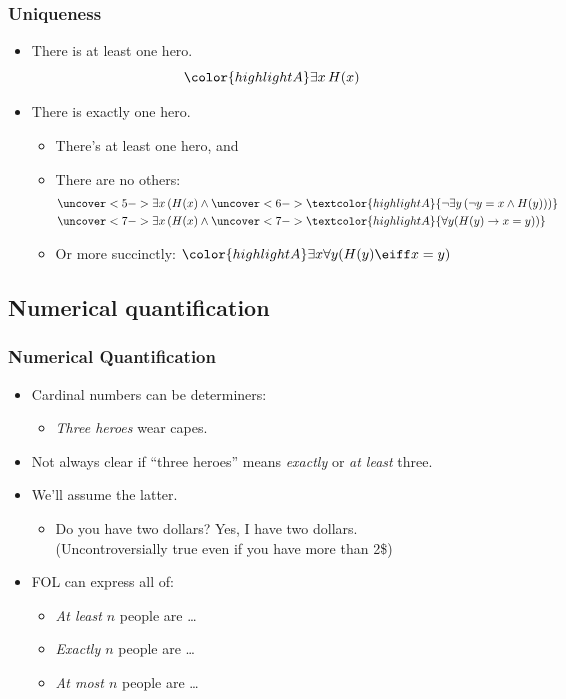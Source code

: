 \begin{frame}
    \frametitle{Uniqueness}

\begin{itemize}[<+->]
\item There is at least one hero.
\[\color{highlightA}
\exists x\, H(x)
\]
\item There is exactly one hero.
\begin{itemize}[<+->]
\item There's at least one hero, and
\item There are no others:
\begin{align*}
\uncover<5->{\exists x\, (H(x) \land {}} & 
  \uncover<6->{\textcolor{highlightA}{\lnot \exists y\, (\lnot y = x \land H(y)))}}\\
\uncover<7->{\exists x\,(H(x) \land {}} & 
\uncover<7->{\textcolor{highlightA}{\forall y(H(y) \to x = y))}}
\end{align*}
\item<8>Or more succinctly: 
$\color{highlightA}\exists x\forall y(H(y) \eiff x=y)$
\end{itemize}
\end{itemize}
\end{frame}


\subsection{Numerical quantification}

\begin{frame}
    \frametitle{Numerical Quantification}

\begin{itemize}[<+->]
\item Cardinal numbers can be determiners:
\begin{itemize}
\item \emph{Three heroes} wear capes.
\end{itemize}
\item Not always clear if ``three heroes'' means \emph{exactly} or \emph{at least} three.
\item We'll assume the latter.%
\begin{itemize}[<+->]
\item Do you have two dollars? Yes, I have two dollars. \\ (Uncontroversially true even if you have more than 2\$)
\end{itemize}
\item FOL can express all of:
\begin{itemize}[<+->]
\item \emph{At least $n$} people are \dots
\item \emph{Exactly $n$} people are \dots
\item \emph{At most $n$} people are \dots
\end{itemize}
\end{itemize}
\end{frame}


